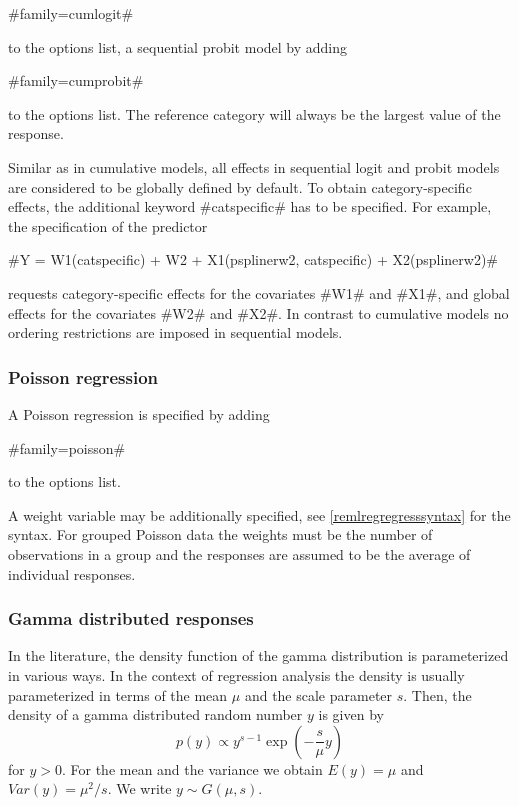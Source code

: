#family=cumlogit#

to the options list, a sequential probit model by adding

#family=cumprobit#

to the options list. The reference category will always be the
largest value of the response.

Similar as in cumulative models, all effects in sequential logit and
probit models are considered to be globally defined by default. To
obtain category-specific effects, the additional keyword
#catspecific# has to be specified. For example, the specification of
the predictor

 #Y = W1(catspecific) + W2 + X1(psplinerw2, catspecific) + X2(psplinerw2)#

requests category-specific effects for the covariates #W1# and #X1#,
and global effects for the covariates #W2# and #X2#. In contrast to
cumulative models no ordering restrictions are imposed in sequential
models.

\subsubsection*{Poisson regression}

A Poisson regression is specified by adding

#family=poisson#

to the options list.

A weight variable may be additionally specified, see
\autoref{remlregregresssyntax} for the syntax. For grouped Poisson
data the weights must be the number of observations in a group and
the responses are assumed to be the average of individual
responses.

\subsubsection*{Gamma distributed responses}

In the literature, the density function of the gamma distribution
is parameterized in various ways. In the context of regression
analysis the density is usually parameterized in terms of the mean
$\mu$ and the scale parameter $s$. Then, the density of a gamma
distributed random number $y$ is given by
\begin{equation}
\label{remlgammapar1} p(y) \propto y^{s-1}\exp(-\frac{s}{\mu} y)
\end{equation}
for $y > 0$. For the mean and the variance we obtain $E(y) = \mu$
and $Var(y) = \mu^2/s$. We write $y \sim G(\mu,s)$.

